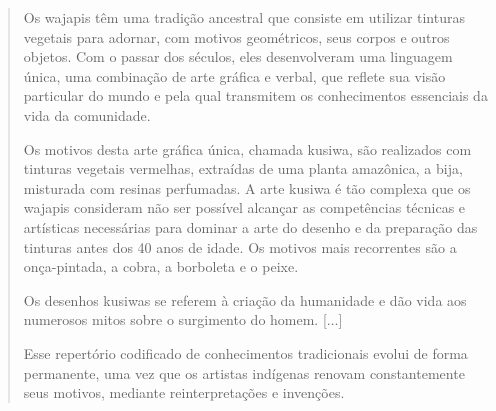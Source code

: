 \begin{escolha}
\begin{quote}
Os wajapis têm uma tradição ancestral que consiste em utilizar tinturas
vegetais para adornar, com motivos geométricos, seus corpos e outros
objetos. Com o passar dos séculos, eles desenvolveram uma linguagem
única, uma combinação de arte gráfica e verbal, que reflete sua visão
particular do mundo e pela qual transmitem os conhecimentos essenciais
da vida da comunidade.

Os motivos desta arte gráfica única, chamada kusiwa, são realizados com
tinturas vegetais vermelhas, extraídas de uma planta amazônica, a bija,
misturada com resinas perfumadas. A arte kusiwa é tão complexa que os
wajapis consideram não ser possível alcançar as competências técnicas e
artísticas necessárias para dominar a arte do desenho e da preparação
das tinturas antes dos 40 anos de idade. Os motivos mais recorrentes são
a onça-pintada, a cobra, a borboleta e o peixe.

Os desenhos kusiwas se referem à criação da humanidade e dão vida aos
numerosos mitos sobre o surgimento do homem. {[}...{]}

Esse repertório codificado de conhecimentos tradicionais evolui de forma
permanente, uma vez que os artistas indígenas renovam constantemente
seus motivos, mediante reinterpretações e invenções.

\end{quote}



\end{escolha}
